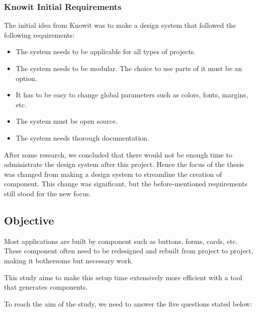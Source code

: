 \subsubsection{Knowit Initial Requirements}%
\label{ssub:Knowit Initial Requirements}
The initial idea from Knowit was to make a design system\cite{fanguyComprehensiveGuideDesign} that followed the following requirements:
\begin{itemize}
  \item The system needs to be applicable for all types of projects.
  \item The system needs to be modular. The choice to use parts of it must be an option.
  \item It has to be easy to change global parameters such as colors, fonts, margins, etc.
  \item The system must be open source.
  \item The system needs thorough documentation.
\end{itemize}

After some research, we concluded that there would not be enough time to administrate the design system after this project. Hence the focus of the thesis was changed from making a design system to streamline the creation of \gls{component}. This change was significant, but the before-mentioned requirements still stood for the new focus. 




\subsection{Objective}
\label{sub:Objective}
Most applications are built by \gls{component} such as buttons, forms, cards\cite{babichSimpleDesignTips2020}, etc. These \gls{component} often need to be redesigned and rebuilt from project to project, making it bothersome but necessary work. 

This study aims to make this setup time extensively more efficient with a tool that generates \glspl{component}. 

To reach the aim of the study, we need to answer the five questions stated below:  

